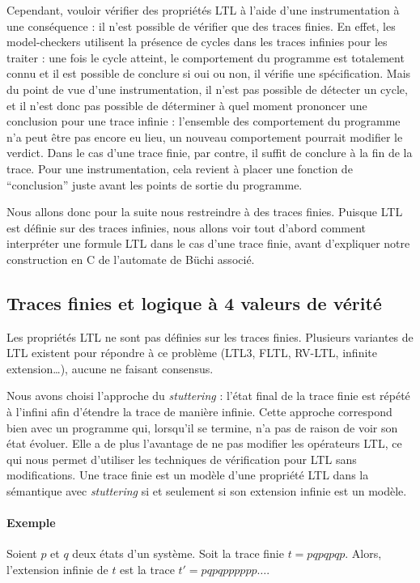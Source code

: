 Cependant, vouloir vérifier des propriétés \ac{LTL} à l'aide d'une
instrumentation à une conséquence : il n'est possible de vérifier que des traces
finies. En effet, les model-checkers utilisent la présence de cycles dans les
traces infinies pour les traiter : une fois le cycle atteint, le comportement du
programme est totalement connu et il est possible de conclure si oui ou non, il
vérifie une spécification. Mais du point de vue d'une instrumentation, il n'est
pas possible de détecter un cycle, et il n'est donc pas possible de déterminer à
quel moment prononcer une conclusion pour une trace infinie : l'ensemble des
comportement du programme n'a peut être pas encore eu lieu, un nouveau
comportement pourrait modifier le verdict. Dans le cas d'une trace finie, par
contre, il suffit de conclure à la fin de la trace. Pour une instrumentation,
cela revient à placer une fonction de ``conclusion'' juste avant les points de
sortie du programme.

Nous allons donc pour la suite nous restreindre à des traces finies. Puisque
\ac{LTL} est définie sur des traces infinies, nous allons voir tout d'abord
comment interpréter une formule \ac{LTL} dans le cas d'une trace finie, avant
d'expliquer notre construction en C de l'automate de Büchi associé.

\subsection{Traces finies et logique à 4 valeurs de vérité}

Les propriétés \ac{LTL} ne sont pas définies sur les traces finies. Plusieurs
variantes de \ac{LTL} existent pour répondre à ce problème (LTL3, FLTL, RV-LTL,
infinite extension\ldots{}), aucune ne faisant consensus.

Nous avons choisi l'approche du \emph{stuttering} : l'état final de la
trace finie est répété à l'infini afin d'étendre la trace de manière
infinie. Cette approche correspond bien avec un programme qui, lorsqu'il
se termine, n'a pas de raison de voir son état évoluer. Elle a de plus
l'avantage de ne pas modifier les opérateurs \ac{LTL}, ce qui nous permet
d'utiliser les techniques de vérification pour \ac{LTL} sans modifications.
Une trace finie est un modèle d'une propriété \ac{LTL} dans la sémantique
avec \emph{stuttering} si et seulement si son extension infinie est un
modèle.

\paragraph{Exemple}
Soient \(p\) et \(q\) deux états d'un système. Soit la trace finie \(t =
pqpqpqp\). Alors, l'extension infinie de \(t\) est la trace \(t' =
pqpqpppppp\dots\).

